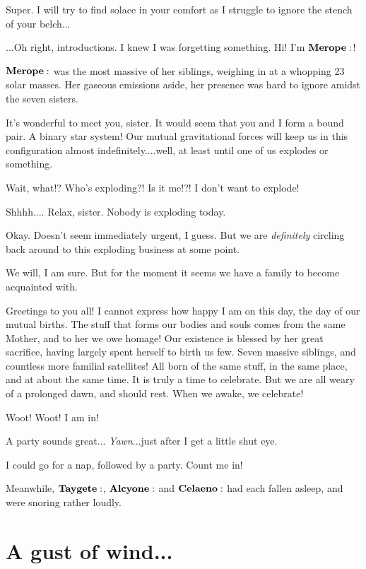 \documentclass[main.tex]{subfiles}
\begin{document}
\Sterope Super.  I will try to find solace in your comfort as I struggle to ignore the stench of your belch...

\Merope ...Oh right, introductions. I knew I was forgetting something.   Hi!  I'm $\Merope$!

$\Merope$ was the most massive of her siblings, weighing in at a whopping 23 solar masses.  Her gaseous emissions aside, her presence was hard to ignore amidst the seven sisters.  

\Maia It's wonderful to meet you, sister.  It would seem that you and I form a bound pair.  A binary star system!  Our mutual gravitational forces will keep us in this configuration almost indefinitely....well, at least until one of us explodes or something.

\Merope Wait, what!?  Who's exploding?!  Is it me!?!  I don't want to explode!

\Maia Shhhh....  Relax, sister.  Nobody is exploding today.  

\Merope Okay.  Doesn't seem immediately urgent, I guess. But we are \textit{definitely} circling back around to this exploding business at some point.

\Maia We will, I am sure.  But for the moment it seems we have a family to become acquainted with.

\Maia Greetings to you all!  I cannot express how happy I am on this day, the day of our mutual births.  The stuff that forms our bodies and souls comes from the same Mother, and to her we owe homage!  Our existence is blessed by her great sacrifice, having largely spent herself to birth us few.  Seven massive siblings, and countless more familial satellites!  All born of the same stuff, in the same place, and at about the same time.  It is truly a time to celebrate.  But we are all weary of a prolonged dawn, and should rest.  When we awake, we celebrate!

\Merope  Woot!  Woot!  I am in!  

\Electra A party sounds great... \textit{Yawn}...just after I get a little shut eye.

\Sterope I could go for a nap, followed by a party.  Count me in!

Meanwhile, $\Taygete$, $\Alcyone$ and $\Celaeno$ had each fallen asleep, and were snoring rather loudly.


\section{A gust of wind...}
\end{document}
